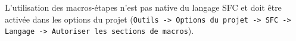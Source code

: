 
L'utilisation des macros-étapes n'est pas native du langage SFC et doit être activée dans les options du projet (\texttt{Outils -> Options du projet -> SFC -> Langage -> Autoriser les sections de macros}).





